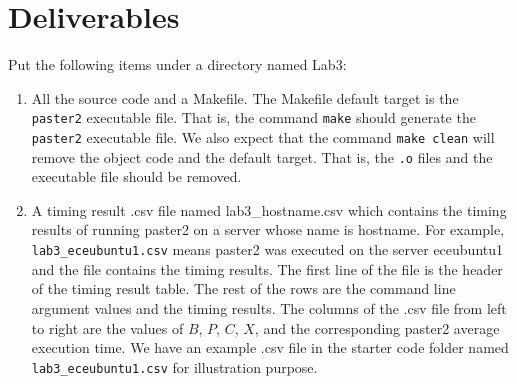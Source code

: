 
\section{Deliverables}
\label{sec:lab3:lab}
Put the following items under a directory named Lab3:
\begin{enumerate}
\item All the source code and a Makefile. The Makefile default target is the \verb+paster2+ executable file. That is, the command \verb+make+ should generate the \verb+paster2+ executable file. We also expect that the command \verb+make clean+ will remove the object code and the default target. That is, the \verb+.o+ files and the executable file should be removed.
\item A timing result .csv file named lab3\_hostname.csv 
  which contains the timing results of running paster2 on a server whose name is hostname. For example, \verb+lab3_eceubuntu1.csv+ means paster2 was executed on the server eceubuntu1 and the file contains the timing results.
  The first line of the file is the header of the timing result table. The rest of the rows are the command line argument values and the timing results. The columns of the .csv file from left to right are the values of $B$, $P$, $C$, $X$, and the corresponding paster2 average execution time. We have an example .csv file in the starter code folder named \verb+lab3_eceubuntu1.csv+ for illustration purpose.


\end{enumerate}
